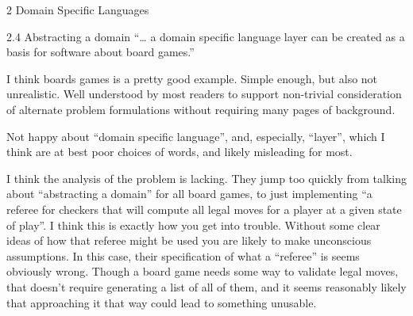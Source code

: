 \documentclass[12pt]{PalisadesLakesBook}
\begin{document}
\begin{plSection}{}
\begin{plSection}{2 Domain Specific Languages}
\begin{plSection}{2.4 Abstracting a domain}
``{\ldots} a domain specific language layer can be created
as a basis for software about board games.''

I think boards games is a pretty good example.
Simple enough, but also not unrealistic.
Well understood by most readers to support non-trivial
consideration of alternate problem formulations
without requiring many pages of background.

Not happy about ``domain specific language'',
and, especially, ``layer'',
which I think are at best poor choices of words,
and likely misleading for most.

I think the analysis of the problem is lacking.
They jump too quickly from talking about ``abstracting a domain''
for all board games, 
to just implementing 
``a referee for checkers that will compute all legal moves 
for a player at a given state of play''.
I think this is exactly how you get into trouble.
Without some clear ideas of how that referee might be used
you are likely to make unconscious assumptions.
In this case, their specification of what a ``referee'' is
seems obviously wrong.
Though a board game needs some way to validate legal moves, 
that doesn't require generating a list of all of them, 
and it seems reasonably likely that approaching it that way
could lead to something unusable. 


\end{plSection}
\end{plSection}
\end{plSection}
\end{document}
